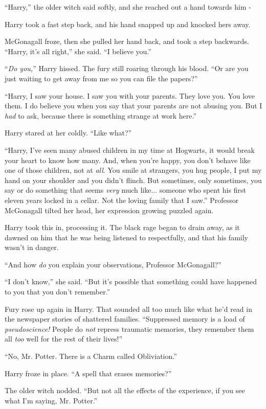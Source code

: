 ``Harry,'' the older witch said softly, and she reached out a hand towards him -

Harry took a fast step back, and his hand snapped up and knocked hers away.

McGonagall froze, then she pulled her hand back, and took a step backwards. ``Harry, it's all right,'' she said. ``I believe you.''

``\emph{Do you,}'' Harry hissed. The fury still roaring through his blood. ``Or are you just waiting to get away from me so you can file the papers?''

``Harry, I saw your house. I saw you with your parents. They love you. You love them. I do believe you when you say that your parents are not abusing you. But I \emph{had} to ask, because there is something strange at work here.''

Harry stared at her coldly. ``Like what?''

``Harry, I've seen many abused children in my time at Hogwarts, it would break your heart to know how many. And, when you're happy, you don't behave like one of those children, not at \emph{all}. You smile at strangers, you hug people, I put my hand on your shoulder and you didn't flinch. But sometimes, only sometimes, you say or do something that seems \emph{very} much like... someone who spent his first eleven years locked in a cellar. Not the loving family that I saw.'' Professor McGonagall tilted her head, her expression growing puzzled again.

Harry took this in, processing it. The black rage began to drain away, as it dawned on him that he was being listened to respectfully, and that his family wasn't in danger.

``And how \emph{do} you explain your observations, Professor McGonagall?''

``I don't know,'' she said. ``But it's possible that something could have happened to you that you don't remember.''

Fury rose up again in Harry. That sounded all too much like what he'd read in the newspaper stories of shattered families. ``Suppressed memory is a load of \emph{pseudoscience!} People do \emph{not} repress traumatic memories, they remember them all \emph{too} well for the rest of their lives!''

``No, Mr. Potter. There is a Charm called Obliviation.''

Harry froze in place. ``A spell that erases memories?''

The older witch nodded. ``But not all the effects of the experience, if you see what I'm saying, Mr. Potter.''

